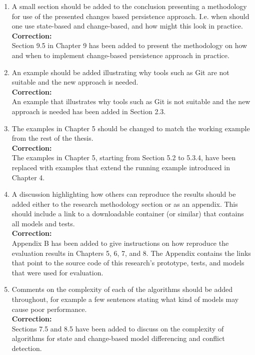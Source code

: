 \documentclass[11pt, a4paper]{report}
\begin{document}
\begin{enumerate}[font=\bfseries]
\item A small section should be added to the conclusion presenting a methodology for use of the presented changes based persistence approach. I.e. when should one use state-based and change-based, and how might this look in practice.
\\\textbf{Correction:}\\
Section 9.5 in Chapter 9 has been added to present the methodology on how and when to implement change-based persistence approach in practice.   

\item An example should be added illustrating why tools such as Git are not suitable and the new approach is needed.
\\\textbf{Correction:}\\
An example that illustrates why tools such as Git is not suitable and the new approach is needed has been added in Section 2.3.

\item The examples in Chapter 5 should be changed to match the working example from the rest of the thesis.
\\\textbf{Correction:}\\
The examples in Chapter 5, starting from Section 5.2 to 5.3.4, have been replaced with examples that extend the running example introduced in Chapter 4.

\item A discussion highlighting how others can reproduce the results should be added either to the research methodology section or as an appendix. This should include a link to a downloadable container (or similar) that contains all models and tests.
\\\textbf{Correction:}\\
Appendix B has been added to give instructions on how reproduce the evaluation results in Chapters 5, 6, 7, and 8. The Appendix contains the links that point to the source code of this research's prototype, tests, and models that were used for evaluation.

\item Comments on the complexity of each of the algorithms should be added throughout, for example a few sentences stating what kind of models may cause poor performance.
\\\textbf{Correction:}\\
Sections 7.5 and 8.5 have been added to discuss on the complexity of algorithms for state and change-based model differencing and conflict detection.


\end{enumerate}
\end{document}
